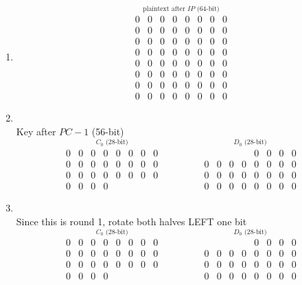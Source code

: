 \documentclass[12pt]{article}
\begin{document}
\begin{enumerate}
\begin{enumerate}
\begin{enumerate}
			\item
				\[
				\stackrel{\mbox{plaintext after $IP$ (64-bit)}}{
				\begin{matrix}
					0&0&0&0&0&0&0&0\\ 
					0&0&0&0&0&0&0&0\\
					0&0&0&0&0&0&0&0\\
					0&0&0&0&0&0&0&0\\
					0&0&0&0&0&0&0&0\\
					0&0&0&0&0&0&0&0\\
					0&0&0&0&0&0&0&0\\
					0&0&0&0&0&0&0&0
				\end{matrix}}
				\]
				
			\item
				\quad\\
				Key after $PC-1$ (56-bit)
				\[
				\stackrel{\mbox{$C_0$ (28-bit)}}{
				\begin{matrix}
					0&0&0&0&0&0&0&0\\ 
					0&0&0&0&0&0&0&0\\
					0&0&0&0&0&0&0&0\\
					0&0&0&0
				\end{matrix}}\quad\quad\quad\quad
				\stackrel{\mbox{$D_0$ (28-bit)}}{
				\begin{matrix}
					{}&{}&{}&{}&0&0&0&0\\ 
					0&0&0&0&0&0&0&0\\
					0&0&0&0&0&0&0&0\\
					0&0&0&0&0&0&0&0
				\end{matrix}}
				\]
				
			\item
				\quad\\
				Since this is round 1, rotate both halves LEFT one bit
				\[
				\stackrel{\mbox{$C_0$ (28-bit)}}{
				\begin{matrix}
					0&0&0&0&0&0&0&0\\ 
					0&0&0&0&0&0&0&0\\
					0&0&0&0&0&0&0&0\\
					0&0&0&0
				\end{matrix}}\quad\quad\quad\quad
				\stackrel{\mbox{$D_0$ (28-bit)}}{
				\begin{matrix}
					{}&{}&{}&{}&0&0&0&0\\ 
					0&0&0&0&0&0&0&0\\
					0&0&0&0&0&0&0&0\\
					0&0&0&0&0&0&0&0
				\end{matrix}}
				\]
				

\end{enumerate}
\end{enumerate}
\end{enumerate}
\end{document}
